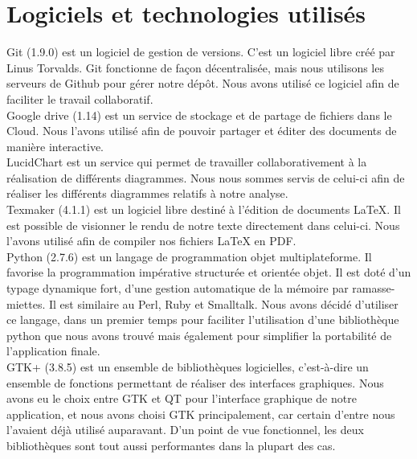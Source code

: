 \documentclass[16pts]{report}
\begin{document}
    \section{Logiciels et technologies utilisés}
    \label{sec:Logiciels et technologies utilisés}

Git (1.9.0) est un logiciel de gestion de versions.  C'est un logiciel libre
créé par Linus Torvalds.  Git fonctionne de façon décentralisée, mais nous
utilisons les serveurs de Github pour gérer notre dépôt.  Nous avons utilisé ce
logiciel afin de faciliter le travail collaboratif.  \\

Google drive (1.14) est un service de stockage et de partage de fichiers 
dans le Cloud. Nous l'avons utilisé afin de pouvoir partager et éditer des documents 
de manière interactive.
\\

LucidChart est un service qui permet de travailler collaborativement à la 
réalisation de différents diagrammes. Nous nous sommes servis de celui-ci 
afin de réaliser les différents diagrammes relatifs à notre analyse.
\\

Texmaker (4.1.1) est un logiciel libre destiné à l'édition de documents 
LaTeX. Il est possible de visionner le rendu de notre texte directement dans 
celui-ci. Nous l'avons utilisé afin de compiler nos fichiers LaTeX en PDF.
\\

Python (2.7.6) est un langage de programmation objet multiplateforme. 
Il favorise la programmation impérative structurée et orientée objet. Il 
est doté d'un typage dynamique fort, d'une gestion automatique de la 
mémoire par ramasse-miettes. Il est similaire au Perl, Ruby et Smalltalk. 
Nous avons décidé d'utiliser ce langage, dans un premier temps pour 
faciliter l'utilisation d'une bibliothèque python que nous avons trouvé 
mais également pour simplifier la portabilité de l'application finale.
\\

GTK+ (3.8.5) est un ensemble de bibliothèques logicielles, c'est-à-dire 
un ensemble de fonctions permettant de réaliser des interfaces graphiques. 
Nous avons eu le choix entre GTK et QT pour l'interface graphique de notre 
application, et nous avons choisi GTK principalement, car certain 
d'entre nous l'avaient déjà utilisé auparavant. D'un point de vue 
fonctionnel, les deux bibliothèques sont tout aussi performantes dans 
la plupart des cas.
\\
\end{document}
